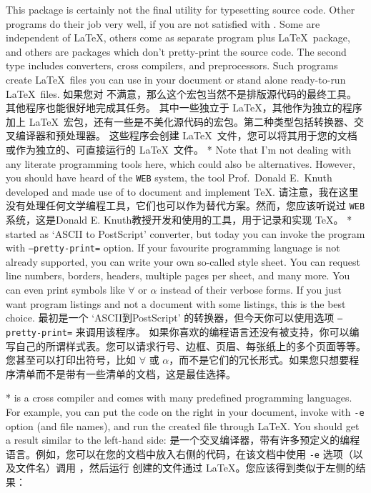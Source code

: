 \begin{paracol}{2}
This package is certainly not the final utility for typesetting source code.
Other programs do their job very well, if you are not satisfied with
. Some are independent of \LaTeX, others come as
separate program plus \LaTeX\ package, and others are packages which
don't pretty-print the source code. The second type includes converters,
cross compilers, and preprocessors. Such programs create \LaTeX\ files
you can use in your document or stand alone ready-to-run \LaTeX\ files.
\switchcolumn
如果您对  不满意，那么这个宏包当然不是排版源代码的最终工具。其他程序也能很好地完成其任务。
其中一些独立于 \LaTeX，其他作为独立的程序加上 \LaTeX\ 宏包，还有一些是不美化源代码的宏包。第二种类型包括转换器、交叉编译器和预处理器。
这些程序会创建 \LaTeX\ 文件，您可以将其用于您的文档或作为独立的、可直接运行的 \LaTeX\ 文件。
\switchcolumn[0]*%
Note that I'm not dealing with any literate programming tools here, which
could also be alternatives. However, you should have heard of the
\texttt{WEB} system, the tool Prof.~Donald E.~Knuth developed and made use
of to document and implement \TeX.
\switchcolumn
请注意，我在这里没有处理任何文学编程工具，它们也可以作为替代方案。然而，您应该听说过 \texttt{WEB}系统，这是Donald E. Knuth教授开发和使用的工具，用于记录和实现 \TeX。
\switchcolumn[0]*%
\textbf{\href{http://www.infres.enst.fr/~demaille/a2ps}{}}
started as `ASCII to PostScript' converter, but today you can invoke the
program with \texttt{--pretty-print=} option. If your
favourite programming language is not already supported, you can write your
own so-called style sheet. You can request line numbers, borders, headers,
multiple pages per sheet, and many more. You can even print symbols like
$\forall$ or $\alpha$ instead of their verbose forms. If you just want
program listings and not a document with some listings, this is the best
choice.
\switchcolumn
\textbf{\href{http://www.infres.enst.fr/~demaille/a2ps}{}}
最初是一个 `ASCII到PostScript' 的转换器，但今天你可以使用选项 \texttt{--pretty-print=} 来调用该程序。
如果你喜欢的编程语言还没有被支持，你可以编写自己的所谓样式表。您可以请求行号、边框、页眉、每张纸上的多个页面等等。
您甚至可以打印出符号，比如 $\forall$ 或 $\alpha$，而不是它们的冗长形式。如果您只想要程序清单而不是带有一些清单的文档，这是最佳选择。

\switchcolumn[0]*%
\textbf{\href{http://mirror.ctan.org/support/lgrind}{}}
is a cross compiler and comes with many predefined programming languages.
For example, you can put the code on the right in your document, invoke
 with \texttt{-e} option (and file names), and run the
created file through \LaTeX. You should get a result similar to the
left-hand side:
\switchcolumn
\textbf{\href{http://mirror.ctan.org/support/lgrind}{}}
是一个交叉编译器，带有许多预定义的编程语言。例如，您可以在您的文档中放入右侧的代码，在该文档中使用 \texttt{-e} 选项（以及文件名）调用 ，然后运行
创建的文件通过 \LaTeX。您应该得到类似于左侧的结果：


\end{paracol}
